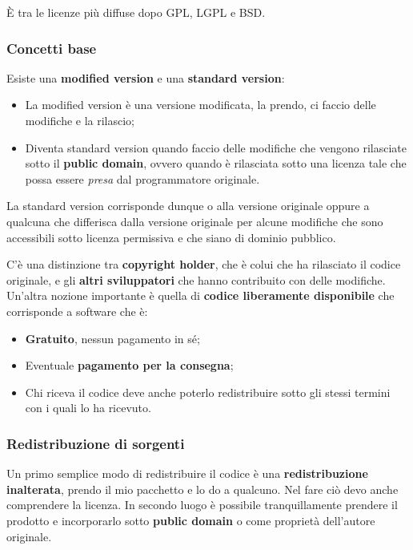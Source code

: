 È tra le licenze più diffuse dopo GPL, LGPL e BSD.

\subsubsection{Concetti base}

Esiste una \textbf{modified version} e una \textbf{standard version}:

\begin{itemize}

\item La modified version è una versione modificata, la prendo, ci faccio delle modifiche e la rilascio;
\item Diventa standard version quando faccio delle modifiche che vengono rilasciate sotto il \textbf{public domain}, ovvero quando è rilasciata sotto una licenza tale che possa essere \textit{presa} dal programmatore originale.

\end{itemize}

La standard version corrisponde dunque o alla versione originale oppure a qualcuna che differisca dalla versione originale per alcune modifiche che sono accessibili sotto licenza permissiva e che siano di dominio pubblico.

C'è una distinzione tra \textbf{copyright holder}, che è colui che ha rilasciato il codice originale, e gli \textbf{altri sviluppatori} che hanno contribuito con delle modifiche. Un'altra nozione importante è quella di \textbf{codice liberamente disponibile} che corrisponde a software che è:

\begin{itemize}

\item \textbf{Gratuito}, nessun pagamento in sé;
\item Eventuale \textbf{pagamento per la consegna};
\item Chi riceva il codice deve anche poterlo redistribuire sotto gli stessi termini con i quali lo ha ricevuto. 

\end{itemize}

\subsubsection{Redistribuzione di sorgenti}

Un primo semplice modo di redistribuire il codice è una \textbf{redistribuzione inalterata}, prendo il mio pacchetto e lo do a qualcuno. Nel fare ciò devo anche comprendere la licenza. In secondo luogo è possibile tranquillamente prendere il prodotto e incorporarlo sotto \textbf{public domain} o come proprietà dell'autore originale. 

